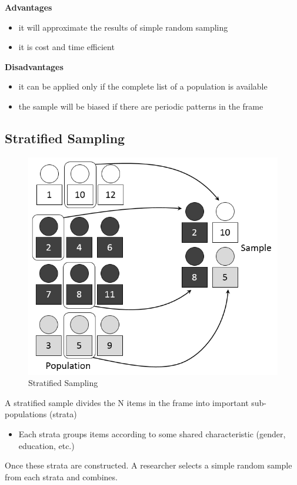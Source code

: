 \documentclass[
]{book}
\providecommand{\tightlist}{%
  \setlength{\itemsep}{0pt}\setlength{\parskip}{0pt}}
\begin{document}
\textbf{Advantages}

\begin{itemize}
\item
  it will approximate the results of simple random sampling
\item
  it is cost and time efficient
\end{itemize}

\textbf{Disadvantages}

\begin{itemize}
\item
  it can be applied only if the complete list of a population is available
\item
  the sample will be biased if there are periodic patterns in the frame
\end{itemize}

\hypertarget{stratified-sampling}{%
\subsection{Stratified Sampling}\label{stratified-sampling}}

\begin{figure}

{\centering \includegraphics[width=0.5\linewidth]{images/Stratified} 

}

\caption{Stratified Sampling}\label{fig:unnamed-chunk-24}
\end{figure}

A stratified sample divides the N items in the frame into important sub-populations (strata)

\begin{itemize}
\tightlist
\item
  Each strata groups items according to some shared characteristic (gender, education, etc.)
\end{itemize}

Once these strata are constructed. A researcher selects a simple random sample from each strata and combines.
\end{document}
